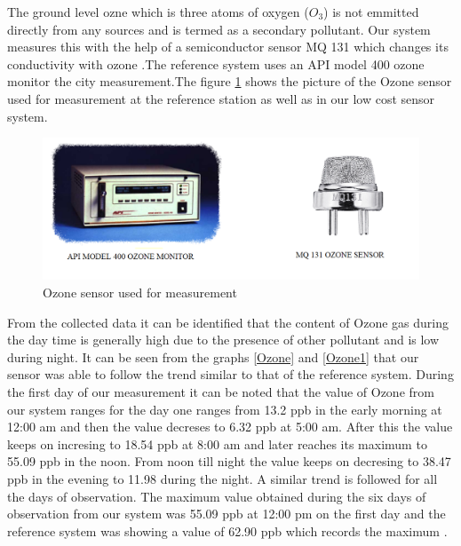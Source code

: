   The ground level ozne which is three atoms of oxygen ($O_3$) is not emmitted directly from any sources and is termed as a secondary pollutant. Our system measures this with the help of a semiconductor sensor MQ 131 which changes its conductivity with ozone \cite{technicalsheetozone}.The reference system uses an API model 400 ozone monitor the city measurement\cite{Environment2010}.The figure \ref{Ozonesensor} shows the picture of the Ozone sensor used for measurement at the reference station as well as in our low cost sensor system.
  \begin{figure}[h]
    \begin{center}
    \includegraphics[scale=0.70]{images/figure30.png}
    \end{center}
    \caption{Ozone sensor used for measurement}
    \label{Ozonesensor}
  \end{figure}
  \bigskip

  
  From the collected data it can be identified that the content of Ozone gas during the day time is generally high due to the presence of other pollutant and is low during night. It can be seen from the graphs \ref{Ozone} and \ref{Ozone1} that our sensor was able to follow the trend similar to that of the reference system. During the first day of our measurement it can be noted that the value of Ozone from our system ranges for the day one ranges from 13.2 ppb in the early morning at 12:00 am and then the value decreses to  6.32 ppb at 5:00 am. After this the value keeps on incresing to 18.54 ppb at 8:00 am and later reaches its maximum to 55.09 ppb in the noon. From noon till night the value keeps on decresing to 38.47 ppb in the evening to 11.98 during the night. A similar trend is followed for all the days of observation. The maximum value obtained during the six days of observation from our system was 55.09 ppb at 12:00 pm on the first day and the reference system was showing a value of 62.90 ppb which records the maximum .

